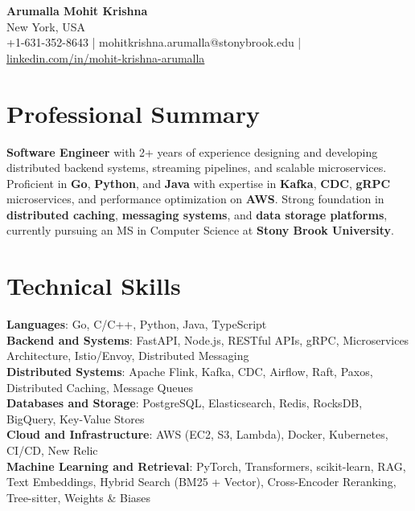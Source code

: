\documentclass[letterpaper,11pt]{article}
\begin{document}
\begin{center}
  {\Large \textbf{Arumalla Mohit Krishna}} \\
  New York, USA \\
  +1-631-352-8643 \enspace | \enspace mohitkrishna.arumalla@stonybrook.edu \enspace | \enspace \href{https://www.linkedin.com/in/mohit-krishna-arumalla}{linkedin.com/in/mohit-krishna-arumalla}
\end{center}

\section{Professional Summary}
  \begin{itemize}[leftmargin=0.15in, label={}]
    \small{\item{
     \textbf{Software Engineer} with 2+ years of experience designing and developing distributed backend systems, streaming pipelines, and scalable microservices. Proficient in \textbf{Go}, \textbf{Python}, and \textbf{Java} with expertise in \textbf{Kafka}, \textbf{CDC}, \textbf{gRPC} microservices, and performance optimization on \textbf{AWS}. Strong foundation in \textbf{distributed caching}, \textbf{messaging systems}, and \textbf{data storage platforms}, currently pursuing an MS in Computer Science at \textbf{Stony Brook University}.
    }}
  \end{itemize}
\vspace{-16pt}

\section{Technical Skills}
 \begin{itemize}[leftmargin=0.15in, label={}]
    \small{\item{
     \textbf{Languages}: Go, C/C++, Python, Java, TypeScript \\
     \textbf{Backend and Systems}: FastAPI, Node.js, RESTful APIs, gRPC, Microservices Architecture, Istio/Envoy, Distributed Messaging \\
     \textbf{Distributed Systems}: Apache Flink, Kafka, CDC, Airflow, Raft, Paxos, Distributed Caching, Message Queues \\
     \textbf{Databases and Storage}: PostgreSQL, Elasticsearch, Redis, RocksDB, BigQuery, Key-Value Stores \\
     \textbf{Cloud and Infrastructure}: AWS (EC2, S3, Lambda), Docker, Kubernetes, CI/CD, New Relic \\
     \textbf{Machine Learning and Retrieval}: PyTorch, Transformers, scikit-learn, RAG, Text Embeddings, Hybrid Search (BM25 + Vector), Cross-Encoder Reranking, Tree-sitter, Weights \& Biases
    }}
 \end{itemize}
\vspace{-16pt}
\end{document}
